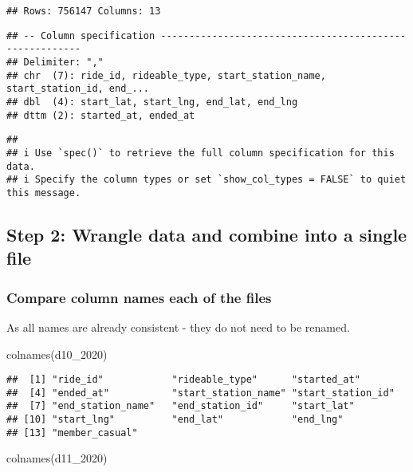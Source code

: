 \documentclass[
]{article}
\newenvironment{Shaded}{\begin{snugshade}}{\end{snugshade}}
\newcommand{\FunctionTok}[1]{\textcolor[rgb]{0.00,0.00,0.00}{#1}}
\newcommand{\NormalTok}[1]{#1}
\begin{document}
\begin{verbatim}
## Rows: 756147 Columns: 13
\end{verbatim}

\begin{verbatim}
## -- Column specification --------------------------------------------------------
## Delimiter: ","
## chr  (7): ride_id, rideable_type, start_station_name, start_station_id, end_...
## dbl  (4): start_lat, start_lng, end_lat, end_lng
## dttm (2): started_at, ended_at
\end{verbatim}

\begin{verbatim}
## 
## i Use `spec()` to retrieve the full column specification for this data.
## i Specify the column types or set `show_col_types = FALSE` to quiet this message.
\end{verbatim}

\hypertarget{step-2-wrangle-data-and-combine-into-a-single-file}{%
\subsection{Step 2: Wrangle data and combine into a single
file}\label{step-2-wrangle-data-and-combine-into-a-single-file}}

\hypertarget{compare-column-names-each-of-the-files}{%
\subsubsection{Compare column names each of the
files}\label{compare-column-names-each-of-the-files}}

As all names are already consistent - they do not need to be renamed.

\begin{Shaded}
\begin{Highlighting}[]
\FunctionTok{colnames}\NormalTok{(d10\_2020)}
\end{Highlighting}
\end{Shaded}

\begin{verbatim}
##  [1] "ride_id"            "rideable_type"      "started_at"        
##  [4] "ended_at"           "start_station_name" "start_station_id"  
##  [7] "end_station_name"   "end_station_id"     "start_lat"         
## [10] "start_lng"          "end_lat"            "end_lng"           
## [13] "member_casual"
\end{verbatim}

\begin{Shaded}
\begin{Highlighting}[]
\FunctionTok{colnames}\NormalTok{(d11\_2020)}
\end{Highlighting}
\end{Shaded}
\end{document}
